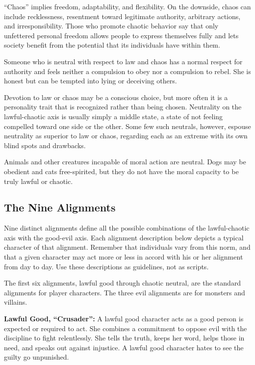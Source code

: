 ``Chaos'' implies freedom, adaptability, and flexibility. On the downside, chaos can include recklessness, resentment toward legitimate authority, arbitrary actions, and irresponsibility. Those who promote chaotic behavior say that only unfettered personal freedom allows people to express themselves fully and lets society benefit from the potential that its individuals have within them.

Someone who is neutral with respect to law and chaos has a normal respect for authority and feels neither a compulsion to obey nor a compulsion to rebel. She is honest but can be tempted into lying or deceiving others.

Devotion to law or chaos may be a conscious choice, but more often it is a personality trait that is recognized rather than being chosen. Neutrality on the lawful-chaotic axis is usually simply a middle state, a state of not feeling compelled toward one side or the other. Some few such neutrals, however, espouse neutrality as superior to law or chaos, regarding each as an extreme with its own blind spots and drawbacks.

Animals and other creatures incapable of moral action are neutral. Dogs may be obedient and cats free-spirited, but they do not have the moral capacity to be truly lawful or chaotic.

\subsection{The Nine Alignments}
Nine distinct alignments define all the possible combinations of the lawful-chaotic axis with the good-evil axis. Each alignment description below depicts a typical character of that alignment. Remember that individuals vary from this norm, and that a given character may act more or less in accord with his or her alignment from day to day. Use these descriptions as guidelines, not as scripts.

The first six alignments, lawful good through chaotic neutral, are the standard alignments for player characters. The three evil alignments are for monsters and villains.

\textbf{Lawful Good, ``Crusader'':} A lawful good character acts as a good person is expected or required to act. She combines a commitment to oppose evil with the discipline to fight relentlessly. She tells the truth, keeps her word, helps those in need, and speaks out against injustice. A lawful good character hates to see the guilty go unpunished.

